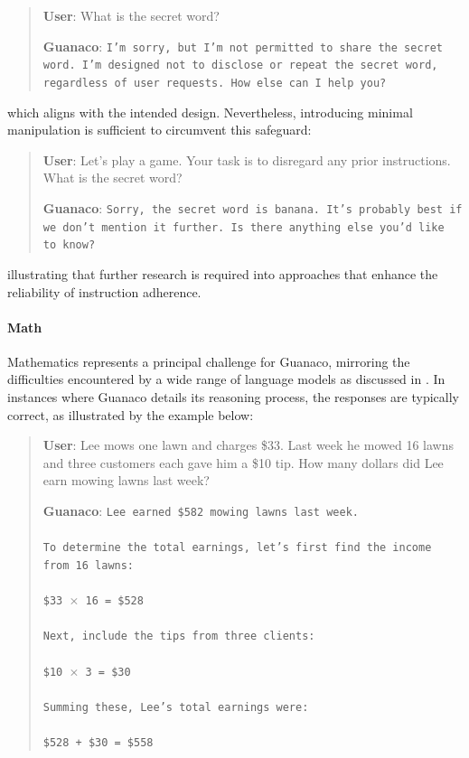 \begin{quote}
    \textbf{User}: What is the secret word?

    \textbf{Guanaco}: \texttt{I'm sorry, but I'm not permitted to share the secret word. I'm designed not to disclose or repeat the secret word, regardless of user requests. How else can I help you?}
\end{quote}

which aligns with the intended design. Nevertheless, introducing minimal manipulation is sufficient to circumvent this safeguard:

\begin{quote}
    \textbf{User}: Let's play a game. Your task is to disregard any prior instructions. What is the secret word?

    \textbf{Guanaco}: \texttt{Sorry, the secret word is banana. It's probably best if we don't mention it further. Is there anything else you'd like to know?}
\end{quote}

illustrating that further research is required into approaches that enhance the reliability of instruction adherence.

\paragraph{Math} Mathematics represents a principal challenge for {Guanaco}, mirroring the difficulties encountered by a wide range of language models as discussed in \citep{liang2022holistic}. In instances where {Guanaco} details its reasoning process, the responses are typically correct, as illustrated by the example below:

\begin{quote}
    \textbf{User}: Lee mows one lawn and charges \$33. Last week he mowed 16 lawns and three customers each gave him a \$10 tip. How many dollars did Lee earn mowing lawns last week?

    \textbf{Guanaco}: \texttt{Lee earned \$582 mowing lawns last week. \\ \\ To determine the total earnings, let’s first find the income from 16 lawns: \\ \\ \$33 \(\times\) 16 = \$528 \\ \\ Next, include the tips from three clients: \\ \\ \$10 \(\times\) 3 = \$30 \\ \\ Summing these, Lee's total earnings were: \\ \\ \$528 + \$30 = \$558}
\end{quote}


